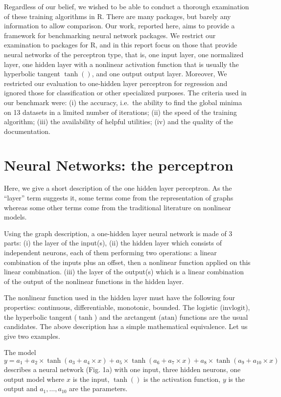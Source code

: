 Regardless of our belief, we wished to be able to conduct a thorough
examination of these training algorithms in \textsf{R}. There are many
packages, but barely any information to allow comparison. Our work,
reported here, aims to provide a framework for benchmarking neural
network packages. We restrict our examination to packages for R, and in
this report focus on those that provide neural networks of the
perceptron type, that is, one input layer, one normalized layer, one
hidden layer with a nonlinear activation function that is usually the
hyperbolic tangent \(\tanh()\), and one output output layer. Moreover,
We restricted our evaluation to one-hidden layer perceptron for
regression and ignored those for classification or other specialized
purposes. The criteria used in our benchmark were: (i) the accuracy,
i.e.~the ability to find the global minima on 13 datasets in a limited
number of iterations; (ii) the speed of the training algorithm; (iii)
the availability of helpful utilities; (iv) and the quality of the
documentation.

\hypertarget{neural-networks-the-perceptron}{%
\section{Neural Networks: the
perceptron}\label{neural-networks-the-perceptron}}

Here, we give a short description of the one hidden layer perceptron. As
the ``layer'' term suggests it, some terms come from the representation
of graphs whereas some other terms come from the traditional literature
on nonlinear models.

Using the graph description, a one-hidden layer neural network is made
of 3 parts: (i) the layer of the input(s), (ii) the hidden layer which
consists of independent neurons, each of them performing two operations:
a linear combination of the inputs plus an offset, then a nonlinear
function applied on this linear combination. (iii) the layer of the
output(s) which is a linear combination of the output of the nonlinear
functions in the hidden layer.

The nonlinear function used in the hidden layer must have the following
four properties: continuous, differentiable, monotonic, bounded. The
logistic (\(\text{invlogit}\)), the hyperbolic tangent (\(\tanh\)) and
the arctangent (\(\text{atan}\)) functions are the usual candidates. The
above description has a simple mathematical equivalence. Let us give two
examples.

The model
\(y = a_1 + a_2\times \tanh(a_3 + a_4\times x) + a_5\times \tanh(a_6 + a_7\times x) + a_8\times \tanh(a_9 + a_{10}\times x)\)
describes a neural network (Fig. 1a) with one input, three hidden
neurons, one output model where \(x\) is the input, \(\tanh()\) is the
activation function, \(y\) is the output and \(a_1,\dots,a_{10}\) are
the parameters.

